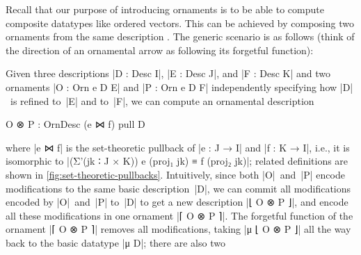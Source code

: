 Recall that our purpose of introducing ornaments is to be able to compute composite datatypes like ordered vectors.
This can be achieved by composing two ornaments from the same description .
The generic scenario is as follows (think of the direction of an ornamental arrow as following its forgetful function):
\begin{center}
\qquad
{}
\end{center}
Given three descriptions |D : Desc I|, |E : Desc J|, and |F : Desc K| and two ornaments |O : Orn e D E| and |P : Orn e D F| independently specifying how |D|~is refined to~|E| and to~|F|, we can compute an ornamental description
\begin{code}
O ⊗ P : OrnDesc (e ⋈ f) pull D
\end{code}
where |e ⋈ f| is the set-theoretic pullback of |e : J → I| and |f : K → I|, i.e., it is isomorphic to |(Σ'(jk ∶ J × K)) e (proj₁ jk) ≡ f (proj₂ jk)|; related definitions are shown in \autoref{fig:set-theoretic-pullbacks}.
Intuitively, since both |O|~and~|P| encode modifications to the same basic description~|D|, we can commit all modifications encoded by |O|~and~|P| to~|D| to get a new description |⌊ O ⊗ P ⌋|, and encode all these modifications in one ornament |⌈ O ⊗ P ⌉|.
The forgetful function of the ornament |⌈ O ⊗ P ⌉| removes all modifications, taking |μ ⌊ O ⊗ P ⌋| all the way back to the basic datatype |μ D|; there are also two 
